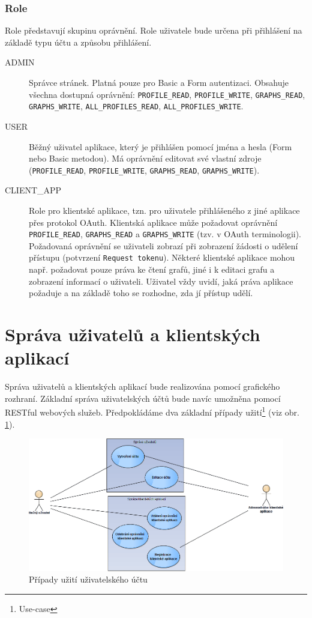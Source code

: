 \documentclass[thesis=M,czech]{FITthesis}[2014/05/6]
\begin{document}
\subsubsection{Role}
Role představují skupinu oprávnění. Role uživatele bude určena při přihlášení na základě typu účtu a způsobu přihlášení.
\begin{description}
  \item[ADMIN] Správce stránek. Platná pouze pro Basic a Form autentizaci. Obsahuje všechna dostupná oprávnění: \texttt{PROFILE\_READ}, \texttt{PROFILE\_WRITE}, 
  \newline \texttt{GRAPHS\_READ}, \texttt{GRAPHS\_WRITE}, \texttt{ALL\_PROFILES\_READ}, \texttt{ALL\_PROFILES\_WRITE}.
  \item[USER] Běžný uživatel aplikace, který je přihlášen pomocí jména a hesla (Form nebo Basic metodou). Má oprávnění editovat své vlastní zdroje (\texttt{PROFILE\_READ}, \texttt{PROFILE\_WRITE}, \texttt{GRAPHS\_READ}, \texttt{GRAPHS\_WRITE}).
  \item[CLIENT\_APP] Role pro klientské aplikace, tzn. pro uživatele přihlášeného z jiné aplikace přes protokol OAuth. Klientská aplikace může požadovat oprávnění \texttt{PROFILE\_READ}, \texttt{GRAPHS\_READ} a \texttt{GRAPHS\_WRITE} (tzv.  v OAuth terminologii). Požadovaná oprávnění se uživateli zobrazí při zobrazení žádosti o udělení přístupu (potvrzení \texttt{Request tokenu}). Některé klientské aplikace mohou např. požadovat pouze práva ke čtení grafů, jiné i k editaci grafu a zobrazení informací o uživateli. Uživatel vždy uvidí, jaká práva aplikace požaduje a na základě toho se rozhodne, zda jí přístup udělí.
\end{description}

\section{Správa uživatelů a klientských aplikací}
Správa uživatelů a klientských aplikací bude realizována pomocí grafického rozhraní. Základní správa uživatelských účtů bude navíc umožněna pomocí RESTful webových služeb.
Předpokládáme dva základní případy užití\footnote{Use-case} (viz obr. \ref{fig:sprava_uzivatelu-use_cases}).

\begin{figure}\centering
 	\includegraphics[width=1\textwidth]{images/diagram/sprava_uzivatelu-use_cases}
 	\caption[Případy užití uživatelského účtu]{Případy užití uživatelského účtu}\label{fig:sprava_uzivatelu-use_cases}
\end{figure}
\end{document}
